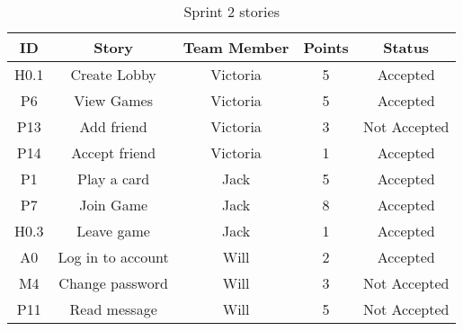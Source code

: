 \begin{table}[h]
\centering
\begin{tabular}{|c|c|c|c|c|}
\hline
\textbf{ID} & \textbf{Story}    & \textbf{Team Member} & \textbf{Points} & \textbf{Status} \\ \hline
H0.1 & Create Lobby      & Victoria    & 5      & Accepted     \\ \hline
P6   & View Games        & Victoria    & 5      & Accepted     \\ \hline
P13  & Add friend        & Victoria    & 3      & Not Accepted \\ \hline
P14  & Accept friend     & Victoria    & 1      & Accepted     \\ \hline
P1   & Play a card       & Jack        & 5      & Accepted     \\ \hline
P7   & Join Game         & Jack        & 8      & Accepted     \\ \hline
H0.3 & Leave game        & Jack        & 1      & Accepted     \\ \hline
A0   & Log in to account & Will        & 2      & Accepted     \\ \hline
M4   & Change password   & Will        & 3      & Not Accepted \\ \hline
P11  & Read message      & Will        & 5      & Not Accepted \\ \hline
\end{tabular}
\caption{Sprint 2 stories}
\label{Table 4}
\end{table}

